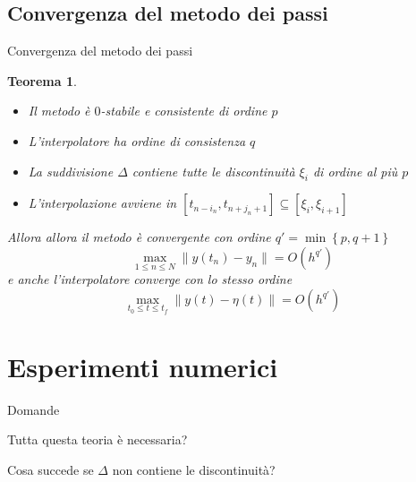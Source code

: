\documentclass[intlimits]{beamer}
\numberwithin{equation}{section}
\theoremstyle{plain}
\newtheorem{teor}{Teorema}[section]
\theoremstyle{definition}
\theoremstyle{remark}
\begin{document}
\subsection{Convergenza del metodo dei passi}

\begin{frame}{Convergenza del metodo dei passi}

\begin{teor}

\begin{itemize}[<+->]
 \item Il metodo è $0$-stabile e consistente di ordine $p$
 \item L'interpolatore ha ordine di consistenza $q$
 \item La suddivisione $\Delta$ contiene tutte le discontinuità $\xi_i$ di ordine al più $p$
 \item L'interpolazione avviene in $[t_{n-i_n},t_{n+j_n+1}] \subseteq [\xi_i, \xi_{i+1}]$
\end{itemize}

\pause
Allora allora il metodo è convergente con ordine $q' = \min \left \{ p,q+1 \right \}$
$$
\max_{1 \le n \le N} \| y(t_n) - y_n \| = O(h^{q'})
$$
e anche l'interpolatore converge con lo stesso ordine
$$
\max_{t_0 \le t \le t_f} \| y(t) - \eta(t) \| = O(h^{q'})
$$

\end{teor}
 
\end{frame}


\section{Esperimenti numerici}

\begin{frame}{Domande}

\pause
\begin{block}{}
  Tutta questa teoria è necessaria?
\end{block}

\pause
\begin{block}{}
Cosa succede se $\Delta$ non contiene le discontinuità?
\end{block}

\end{frame}
\end{document}
